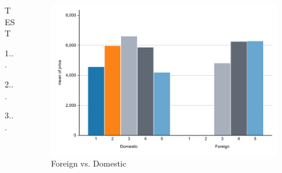 \documentclass{beamer}
\begin{document}
    \begin{frame}
    \begin{columns}%
    \begin{column}{0.5\textwidth}%
    TEST 

    1...

    2...

    3...
  \end{column}

  \begin{column}{0.5\textwidth}
        \begin{figure}

            \centering
            \caption{Foreign vs. Domestic}
            \includegraphics[width=0.75\linewidth]{simple_figure/figure1.pdf}
        \end{figure}
    \end{column}
    \end{columns}
    \end{frame}
\end{document}
